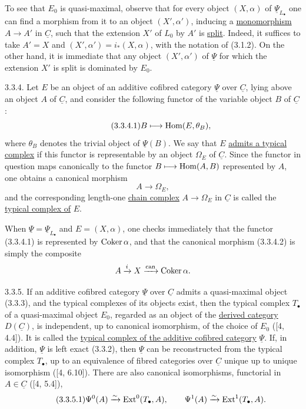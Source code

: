 To see that $E_0$ is quasi-maximal, observe that for every object
$(X,\alpha)$ of $\underline\Psi_{L_\bullet}$ one can find a morphism
from it to an object $(X',\alpha')$, inducing a
\underline{monomorphism} $A\longrightarrow A'$ in $\underline C$,
such that the extension $X'$ of $L_0$ by $A'$ is \underline{split}.
Indeed, it suffices to take $A'=X$ and
$(X',\alpha')=i_*(X,\alpha)$, with the notation of (3.1.2). On the
other hand, it is immediate that any object $(X',\alpha')$ of
$\underline\Psi$ for which the extension $X'$ is split is dominated
by $E_0$.

3.3.4. Let $E$ be an object of an additive cofibred category
$\underline\Psi$ over $\underline C$, lying above an object $A$ of
$\underline C$, and consider the following functor of the variable
object $B$ of $\underline C$:
\begin{equation}\tag{3.3.4.1}
 B\longmapsto\operatorname{Hom}(E,\theta_B),
\end{equation}
where $\theta_B$ denotes the trivial object of $\underline\Psi(B)$.
We say that $E$ \underline{admits a typical complex} if this functor
is representable by an object $\Omega_E$ of $\underline C$. Since
the functor in question maps canonically to the functor
$B\longmapsto\operatorname{Hom}(A,B)$ represented by $A$, one obtains a canonical
morphism
\begin{equation}\tag{3.3.4.2}
 A\longrightarrow\Omega_E,
\end{equation}
and the corresponding length-one \underline{chain complex}
$A\longrightarrow\Omega_E$ in $\underline C$ is called the
\underline{typical complex of} $E$.

When $\underline\Psi=\underline\Psi_{L_\bullet}$ and
$E=(X,\alpha)$, one checks immediately that the functor (3.3.4.1) is
represented by $\operatorname{Coker}\alpha$, and that the canonical morphism
(3.3.4.2) is simply the composite
\[
 A\xrightarrow{i}X\xrightarrow{\mathrm{can}}\operatorname{Coker}\alpha.
\]

3.3.5. If an additive cofibred category $\underline\Psi$ over
$\underline C$ admits a quasi-maximal object (3.3.3), and the typical
complexes of its objects exist, then the typical complex $T_\bullet$
of a quasi-maximal object $E_0$, regarded as an object of the
\underline{derived category} $D(\underline C)$, is independent, up
to canonical isomorphism, of the choice of $E_0$ ([4, 4.4]). It is
called the \underline{typical complex of the additive cofibred
category} $\underline\Psi$. If, in addition, $\underline\Psi$ is
left exact (3.3.2), then $\underline\Psi$ can be reconstructed from
the typical complex $T_\bullet$, up to an equivalence of fibred
categories over $\underline C$ unique up to unique isomorphism
([4, 6.10]). There are also canonical isomorphisms, functorial in
$A\in\underline C$ ([4, 5.4]),
\begin{equation}\tag{3.3.5.1}
 \Psi^0(A)\xrightarrow{\sim}\operatorname{Ext}^0(T_\bullet,A),
 \qquad
 \Psi^1(A)\xrightarrow{\sim}\operatorname{Ext}^1(T_\bullet,A).
\end{equation}

